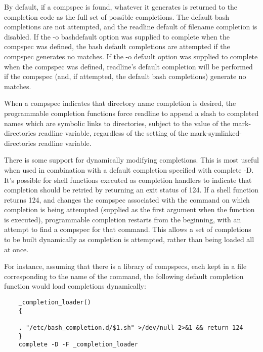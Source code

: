 By default, if a compspec is found, whatever it generates is returned to the completion code as the full set of possible completions. The default bash completions are not attempted, and the readline default of filename completion is disabled. If the -o bashdefault option was supplied to complete when the compspec was defined, the bash default completions are attempted if the compspec generates no matches. If the -o default option was supplied to complete when the compspec was defined, readline's default completion will be performed if the compspec (and, if attempted, the default bash completions) generate no matches.

When a compspec indicates that directory name completion is desired, the programmable completion functions force readline to append a slash to completed names which are symbolic links to directories, subject to the value of the mark-directories readline variable, regardless of the setting of the mark-symlinked-directories readline variable.

There is some support for dynamically modifying completions. This is most useful when used in combination with a default completion specified with complete -D. It's possible for shell functions executed as completion handlers to indicate that completion should be retried by returning an exit status of 124. If a shell function returns 124, and changes the compspec associated with the command on which completion is being attempted (supplied as the first argument when the function is executed), programmable completion restarts from the beginning, with an attempt to find a compspec for that command. This allows a set of completions to be built dynamically as completion is attempted, rather than being loaded all at once.

For instance, assuming that there is a library of compspecs, each kept in a file corresponding to the name of the command, the following default completion function would load completions dynamically:

\begin{lstlisting}
    _completion_loader()
    {
    
    . "/etc/bash_completion.d/$1.sh" >/dev/null 2>&1 && return 124
    }
    complete -D -F _completion_loader
\end{lstlisting} %